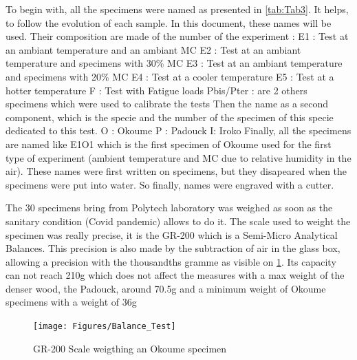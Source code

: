 To begin with, all the specimens were named as presented in \ref{tab:Tab3}. It helps, to follow the evolution of each sample.
In this document, these names will be used. Their composition are made of the number of the experiment :
\newline
E1 : Test at an ambiant temperature and an ambiant MC
\newline
E2 : Test at an ambiant temperature and specimens with 30\% MC
\newline
E3 : Test at an ambiant temperature and specimens with 20\% MC
\newline
E4 : Test at a cooler temperature
\newline
E5 : Test at a hotter temperature
\newline
F : Test with Fatigue loads
\newline
Pbis/Pter : are 2 others specimens which were used to calibrate the tests
\newline
\newline
Then the name as a second component, which is the specie and the number of the specimen of this specie dedicated to this test.
\newline
O : Okoume
\newline
P : Padouck
\newline
I: Iroko
\newline
\newline
Finally, all the specimens are named like E1O1 which is the first specimen of Okoume used for the first type of experiment (ambient temperature and MC due to relative humidity in the air). These names were first written on specimens, but they disapeared when the specimens were put into water. So finally, names were engraved with a cutter. %

The 30 specimens bring from Polytech laboratory was weighed as soon as the sanitary condition (Covid pandemic) allows to do it. The scale used to weight the specimen was really precise, it is the GR-200 which is a Semi-Micro Analytical Balances. This precision is also made by the subtraction of air in the glass box, allowing a precision with the thousandths gramme as visible on \ref{fig:Fig9}. Its capacity can not reach 210g which does not affect the measures with a max weight of the denser wood, the Padouck, around 70.5g and a minimum weight of Okoume specimens with a weight of 36g
\begin{figure}[th]
	\centering
	\texttt{[image: Figures/Balance\_Test]}
	\decoRule
	\caption[GR-200 Scale]{GR-200 Scale weigthing an Okoume specimen}
	\label{fig:Fig9}
\end{figure}

